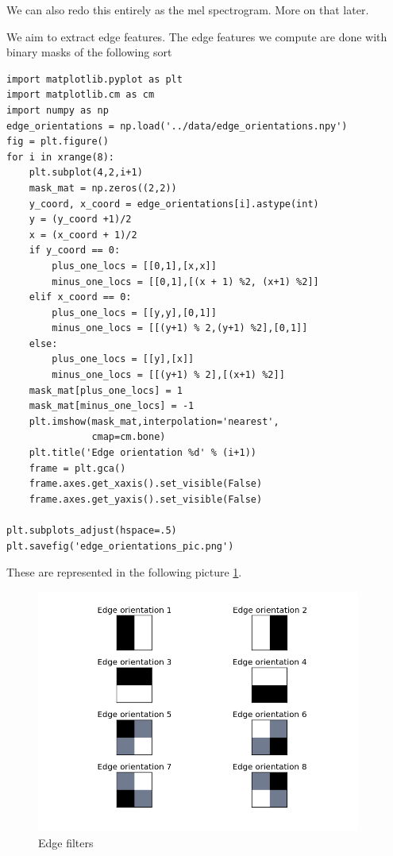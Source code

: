 \documentclass[11pt]{article}
\begin{document}
We can also redo this entirely as the mel spectrogram.  More on that later.

We aim to extract edge features.  The edge features we compute are done
with binary masks of the following sort


\begin{verbatim}
import matplotlib.pyplot as plt
import matplotlib.cm as cm
import numpy as np
edge_orientations = np.load('../data/edge_orientations.npy')
fig = plt.figure()
for i in xrange(8):
    plt.subplot(4,2,i+1)
    mask_mat = np.zeros((2,2))
    y_coord, x_coord = edge_orientations[i].astype(int)
    y = (y_coord +1)/2
    x = (x_coord + 1)/2
    if y_coord == 0:
        plus_one_locs = [[0,1],[x,x]]
        minus_one_locs = [[0,1],[(x + 1) %2, (x+1) %2]]
    elif x_coord == 0:
        plus_one_locs = [[y,y],[0,1]]
        minus_one_locs = [[(y+1) % 2,(y+1) %2],[0,1]]
    else:
        plus_one_locs = [[y],[x]]
        minus_one_locs = [[(y+1) % 2],[(x+1) %2]]
    mask_mat[plus_one_locs] = 1
    mask_mat[minus_one_locs] = -1
    plt.imshow(mask_mat,interpolation='nearest',
               cmap=cm.bone)
    plt.title('Edge orientation %d' % (i+1))
    frame = plt.gca()
    frame.axes.get_xaxis().set_visible(False)
    frame.axes.get_yaxis().set_visible(False)

plt.subplots_adjust(hspace=.5)
plt.savefig('edge_orientations_pic.png')
\end{verbatim}



These are represented in the following picture \ref{fig:edge_orientations}.

\begin{figure}[htb]
\centering
\includegraphics[height=8cm]{./edge_orientations_pic.png}
\caption{\label{fig:edge_orientations}Edge filters}
\end{figure}
\end{document}
